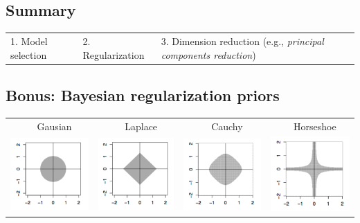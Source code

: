 \documentclass[11pt, oneside]{article}
\begin{document}
\subsection{Summary}
\begin{tabular}{lll}
1. Model selection &2. Regularization &3. Dimension reduction (e.g., \emph{principal components reduction})
\end{tabular}

\subsection{Bonus: Bayesian regularization priors}

\begin{tabular}{rrrr}
\multicolumn{1}{c}{$\quad$Gausian} & \multicolumn{1}{c}{$\quad$Laplace} & \multicolumn{1}{c}{$\quad$Cauchy} & \multicolumn{1}{c}{$\quad$Horseshoe} \\
 \includegraphics[width=1.55in]{regularization_prior3_R.png} &
 \includegraphics[width=1.5in]{regularization_prior3_L.png} &
  \includegraphics[width=1.55in]{regularization_prior3_C.png} &
 \includegraphics[width=1.5in]{regularization_prior3_H.png} \\

\end{tabular}
\end{document}
